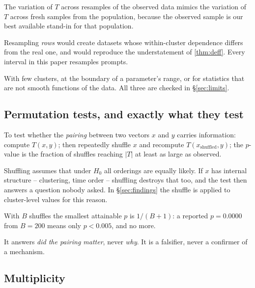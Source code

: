  The variation of $T$ across resamples of the
observed data mimics the variation of $T$ across fresh samples from the
population, because the observed sample is our best available stand-in for that
population.

 Resampling \emph{rows}
would create datasets whose within-cluster dependence differs from the real one,
and would reproduce the understatement of \cref{thm:deff}. Every interval in
this paper resamples prompts.

 With few clusters, at the boundary of a parameter's range,
or for statistics that are not smooth functions of the data. All three are
checked in §\ref{sec:limits}.

\subsection{Permutation tests, and exactly what they test}

\begin{protocol}
To test whether the \emph{pairing} between two vectors $x$ and $y$ carries
information: compute $T(x,y)$; then repeatedly shuffle $x$ and recompute
$T(x_{\text{shuffled}}, y)$; the $p$-value is the fraction of shuffles reaching
$|T|$ at least as large as observed.
\end{protocol}

\begin{remark}
Shuffling assumes that under $H_0$ all orderings are equally likely. If $x$ has
internal structure -- clustering, time order -- shuffling destroys that too, and
the test then answers a question nobody asked. In §\ref{sec:findings} the shuffle
is applied to cluster-level values for this reason.
\end{remark}

\begin{remark}
With $B$ shuffles the smallest attainable $p$ is $1/(B+1)$: a reported
$p = 0.0000$ from $B = 200$ means only $p < 0.005$, and no more.
\end{remark}

\begin{remark}
It answers \emph{did the pairing matter}, never \emph{why}. It is a falsifier,
never a confirmer of a mechanism.
\end{remark}

\subsection{Multiplicity}

